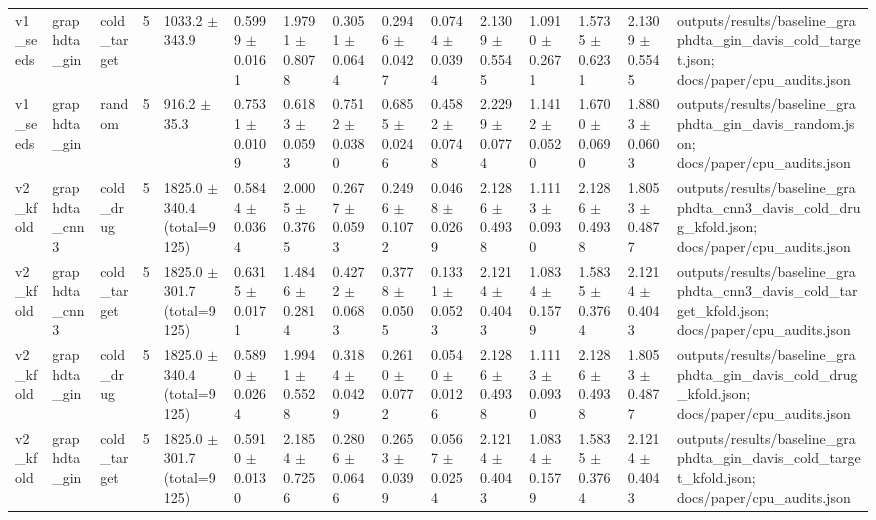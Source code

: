 \begin{table}[htbp]
\begin{tabular}{lllllllllllllll}
v1\_seeds & graphdta\_gin & cold\_target & 5 & 1033.2 $\pm$ 343.9 & 0.5999 $\pm$ 0.0161 & 1.9791 $\pm$ 0.8078 & 0.3051 $\pm$ 0.0644 & 0.2946 $\pm$ 0.0427 & 0.0744 $\pm$ 0.0394 & 2.1309 $\pm$ 0.5545 & 1.0910 $\pm$ 0.2671 & 1.5735 $\pm$ 0.6231 & 2.1309 $\pm$ 0.5545 & outputs/results/baseline\_graphdta\_gin\_davis\_cold\_target.json; docs/paper/cpu\_audits.json \\
v1\_seeds & graphdta\_gin & random & 5 & 916.2 $\pm$ 35.3 & 0.7531 $\pm$ 0.0109 & 0.6183 $\pm$ 0.0593 & 0.7512 $\pm$ 0.0380 & 0.6855 $\pm$ 0.0246 & 0.4582 $\pm$ 0.0748 & 2.2299 $\pm$ 0.0774 & 1.1412 $\pm$ 0.0520 & 1.6700 $\pm$ 0.0690 & 1.8803 $\pm$ 0.0603 & outputs/results/baseline\_graphdta\_gin\_davis\_random.json; docs/paper/cpu\_audits.json \\
v2\_kfold & graphdta\_cnn3 & cold\_drug & 5 & 1825.0 $\pm$ 340.4 (total=9125) & 0.5844 $\pm$ 0.0364 & 2.0005 $\pm$ 0.3765 & 0.2677 $\pm$ 0.0593 & 0.2496 $\pm$ 0.1072 & 0.0468 $\pm$ 0.0269 & 2.1286 $\pm$ 0.4938 & 1.1113 $\pm$ 0.0930 & 2.1286 $\pm$ 0.4938 & 1.8053 $\pm$ 0.4877 & outputs/results/baseline\_graphdta\_cnn3\_davis\_cold\_drug\_kfold.json; docs/paper/cpu\_audits.json \\
v2\_kfold & graphdta\_cnn3 & cold\_target & 5 & 1825.0 $\pm$ 301.7 (total=9125) & 0.6315 $\pm$ 0.0171 & 1.4846 $\pm$ 0.2814 & 0.4272 $\pm$ 0.0683 & 0.3778 $\pm$ 0.0505 & 0.1331 $\pm$ 0.0523 & 2.1214 $\pm$ 0.4043 & 1.0834 $\pm$ 0.1579 & 1.5835 $\pm$ 0.3764 & 2.1214 $\pm$ 0.4043 & outputs/results/baseline\_graphdta\_cnn3\_davis\_cold\_target\_kfold.json; docs/paper/cpu\_audits.json \\
v2\_kfold & graphdta\_gin & cold\_drug & 5 & 1825.0 $\pm$ 340.4 (total=9125) & 0.5890 $\pm$ 0.0264 & 1.9941 $\pm$ 0.5528 & 0.3184 $\pm$ 0.0429 & 0.2610 $\pm$ 0.0772 & 0.0540 $\pm$ 0.0126 & 2.1286 $\pm$ 0.4938 & 1.1113 $\pm$ 0.0930 & 2.1286 $\pm$ 0.4938 & 1.8053 $\pm$ 0.4877 & outputs/results/baseline\_graphdta\_gin\_davis\_cold\_drug\_kfold.json; docs/paper/cpu\_audits.json \\
v2\_kfold & graphdta\_gin & cold\_target & 5 & 1825.0 $\pm$ 301.7 (total=9125) & 0.5910 $\pm$ 0.0130 & 2.1854 $\pm$ 0.7256 & 0.2806 $\pm$ 0.0646 & 0.2653 $\pm$ 0.0399 & 0.0567 $\pm$ 0.0254 & 2.1214 $\pm$ 0.4043 & 1.0834 $\pm$ 0.1579 & 1.5835 $\pm$ 0.3764 & 2.1214 $\pm$ 0.4043 & outputs/results/baseline\_graphdta\_gin\_davis\_cold\_target\_kfold.json; docs/paper/cpu\_audits.json \\
\bottomrule
\end{tabular}
\begin{flushleft}

\end{flushleft}
\end{table}
